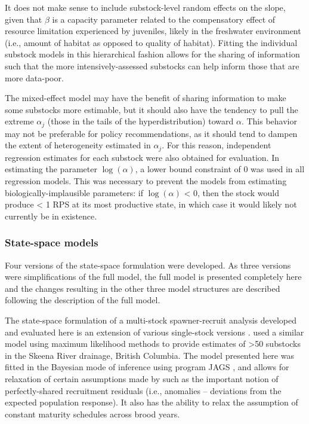 \documentclass[12pt,]{book}
\theoremstyle{definition}
\theoremstyle{definition}
\theoremstyle{definition}
\theoremstyle{remark}
\begin{document}
\noindent
It does not make sense to include substock-level random effects on the
slope, given that \(\beta\) is a capacity parameter related to the
compensatory effect of resource limitation experienced by juveniles,
likely in the freshwater environment (i.e., amount of habitat as opposed
to quality of habitat). Fitting the individual substock models in this
hierarchical fashion allows for the sharing of information such that the
more intensively-assessed substocks can help inform those that are more
data-poor.

The mixed-effect model may have the benefit of sharing information to
make some substocks more estimable, but it should also have the tendency
to pull the extreme \(\alpha_j\) (those in the tails of the
hyperdistribution) toward \(\alpha\). This behavior may not be
preferable for policy recommendations, as it should tend to dampen the
extent of heterogeneity estimated in \(\alpha_j\). For this reason,
independent regression estimates for each substock were also obtained
for evaluation. In estimating the parameter \(\log(\alpha)\), a lower
bound constraint of 0 was used in all regression models. This was
necessary to prevent the models from estimating biologically-implausible
parameters: if \(\log(\alpha)\) \textless{} 0, then the stock would
produce \textless{} 1 RPS at its most productive state, in which case it
would likely not currently be in existence.

\subsubsection{State-space models}\label{ssm-model}

\noindent
Four versions of the state-space formulation were developed. As three
versions were simplifications of the full model, the full model is
presented completely here and the changes resulting in the other three
model structures are described following the description of the full
model.

The state-space formulation of a multi-stock spawner-recruit analysis
developed and evaluated here is an extension of various single-stock
versions \citep[e.g.,][]{fleischman-etal-2013}.
\citet{walters-etal-2008} used a similar model using maximum likelihood
methods to provide estimates of \textgreater{}50 substocks in the Skeena
River drainage, British Columbia. The model presented here was fitted in
the Bayesian mode of inference using program JAGS \citep{plummer-2017},
and allows for relaxation of certain assumptions made by
\citet{walters-etal-2008} such as the important notion of
perfectly-shared recruitment residuals (i.e., anomalies -- deviations
from the expected population response). It also has the ability to relax
the assumption of constant maturity schedules across brood years.
\end{document}
